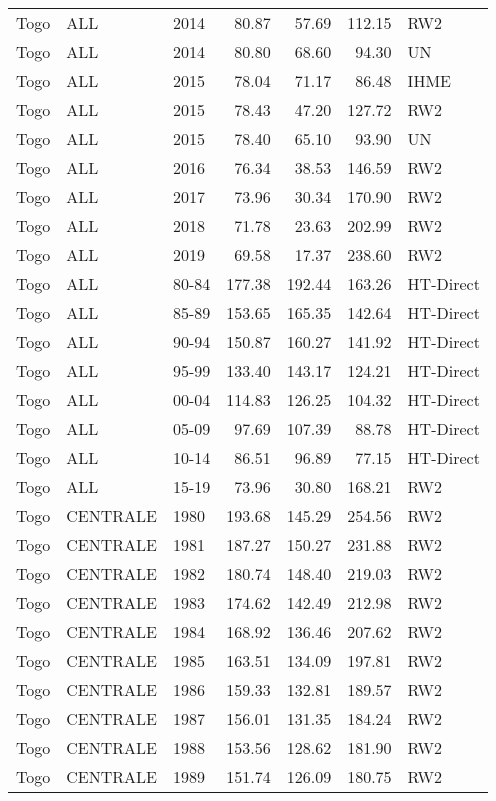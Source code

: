 \begin{longtable}{lllrrrl}
  Togo & ALL & 2014 & 80.87 & 57.69 & 112.15 & RW2 \\ 
  Togo & ALL & 2014 & 80.80 & 68.60 & 94.30 & UN \\ 
  Togo & ALL & 2015 & 78.04 & 71.17 & 86.48 & IHME \\ 
  Togo & ALL & 2015 & 78.43 & 47.20 & 127.72 & RW2 \\ 
  Togo & ALL & 2015 & 78.40 & 65.10 & 93.90 & UN \\ 
  Togo & ALL & 2016 & 76.34 & 38.53 & 146.59 & RW2 \\ 
  Togo & ALL & 2017 & 73.96 & 30.34 & 170.90 & RW2 \\ 
  Togo & ALL & 2018 & 71.78 & 23.63 & 202.99 & RW2 \\ 
  Togo & ALL & 2019 & 69.58 & 17.37 & 238.60 & RW2 \\ 
  Togo & ALL & 80-84 & 177.38 & 192.44 & 163.26 & HT-Direct \\ 
  Togo & ALL & 85-89 & 153.65 & 165.35 & 142.64 & HT-Direct \\ 
  Togo & ALL & 90-94 & 150.87 & 160.27 & 141.92 & HT-Direct \\ 
  Togo & ALL & 95-99 & 133.40 & 143.17 & 124.21 & HT-Direct \\ 
  Togo & ALL & 00-04 & 114.83 & 126.25 & 104.32 & HT-Direct \\ 
  Togo & ALL & 05-09 & 97.69 & 107.39 & 88.78 & HT-Direct \\ 
  Togo & ALL & 10-14 & 86.51 & 96.89 & 77.15 & HT-Direct \\ 
  Togo & ALL & 15-19 & 73.96 & 30.80 & 168.21 & RW2 \\ 
  Togo & CENTRALE & 1980 & 193.68 & 145.29 & 254.56 & RW2 \\ 
  Togo & CENTRALE & 1981 & 187.27 & 150.27 & 231.88 & RW2 \\ 
  Togo & CENTRALE & 1982 & 180.74 & 148.40 & 219.03 & RW2 \\ 
  Togo & CENTRALE & 1983 & 174.62 & 142.49 & 212.98 & RW2 \\ 
  Togo & CENTRALE & 1984 & 168.92 & 136.46 & 207.62 & RW2 \\ 
  Togo & CENTRALE & 1985 & 163.51 & 134.09 & 197.81 & RW2 \\ 
  Togo & CENTRALE & 1986 & 159.33 & 132.81 & 189.57 & RW2 \\ 
  Togo & CENTRALE & 1987 & 156.01 & 131.35 & 184.24 & RW2 \\ 
  Togo & CENTRALE & 1988 & 153.56 & 128.62 & 181.90 & RW2 \\ 
  Togo & CENTRALE & 1989 & 151.74 & 126.09 & 180.75 & RW2 \\ 

\end{longtable}
